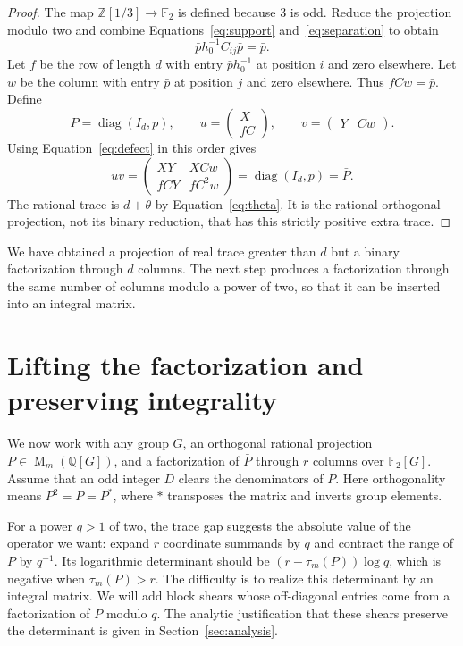 \documentclass[11pt]{article}
\theoremstyle{remark}
\numberwithin{equation}{section}
\newcommand{\F}{\mathbb F}
\newcommand{\Z}{\mathbb Z}
\newcommand{\Q}{\mathbb Q}
\newcommand{\Mat}{\operatorname{M}}
\newcommand{\diag}{\operatorname{diag}}
\begin{document}
\begin{proof}
The map $\Z[1/3]\to\F_2$ is defined because $3$ is odd. Reduce
the projection modulo two and combine
Equations~\eqref{eq:support} and~\eqref{eq:separation} to obtain
\[
 \bar p h_0^{-1} C_{ij}\bar p=\bar p.
\]
Let $f$ be the row of length $d$ with entry $\bar p h_0^{-1}$
at position $i$ and zero elsewhere. Let $w$ be the column with
entry $\bar p$ at position $j$ and zero elsewhere. Thus
$fCw=\bar p$. Define
\[
 P=\diag(I_d,p),\qquad
 u=\begin{pmatrix}X\\fC\end{pmatrix},\qquad
 v=\begin{pmatrix}Y&Cw\end{pmatrix}.
\]
Using Equation~\eqref{eq:defect} in this order gives
\[
 uv=\begin{pmatrix}XY&XCw\\fCY&fC^2w\end{pmatrix}
   =\diag(I_d,\bar p)=\bar P.
\]
The rational trace is $d+\theta$ by Equation~\eqref{eq:theta}.
It is the rational orthogonal projection, not its binary reduction,
that has this strictly positive extra trace.
\end{proof}

We have obtained a projection of real trace greater than $d$ but a
binary factorization through $d$ columns. The next step produces
a factorization through the same number of columns modulo a power of two, so
that it can be inserted into an integral matrix.

\section{Lifting the factorization and preserving integrality}
\label{sec:lifting}

We now work with any group $G$, an orthogonal rational projection
$P\in\Mat_m(\Q[G])$, and a factorization of $\bar P$ through $r$
columns over $\F_2[G]$. Assume that an odd integer $D$ clears the
denominators of $P$. Here orthogonality means $P^2=P=P^*$, where
$*$ transposes the matrix and inverts group elements.

For a power $q>1$ of two, the trace gap suggests the absolute value
of the operator we want: expand $r$ coordinate summands by $q$ and
contract the range of $P$ by $q^{-1}$. Its
logarithmic determinant should be $(r-\tau_m(P))\log q$, which is
negative when $\tau_m(P)>r$. The difficulty is to realize this
determinant by an integral matrix. We will add block shears whose
off-diagonal entries come from a factorization of $P$ modulo $q$.
The analytic justification that these shears preserve the determinant
is given in Section~\ref{sec:analysis}.
\end{document}
